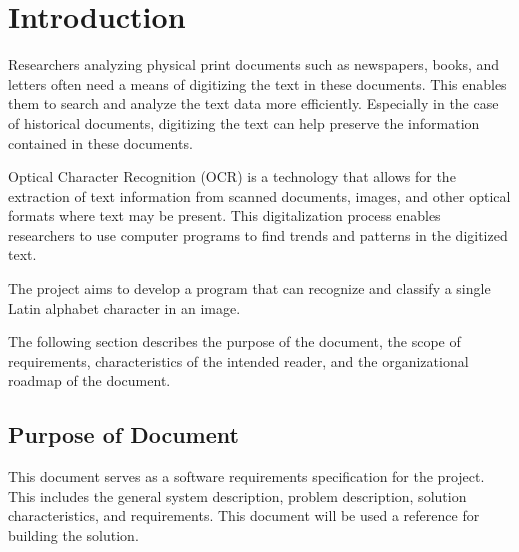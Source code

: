 \documentclass[12pt]{article}
\begin{document}


\section{Introduction}

Researchers analyzing physical print documents such as newspapers, books, and
letters often need a means of digitizing the text in these documents. This
enables them to search and analyze the text data more efficiently. Especially in
the case of historical documents, digitizing the text can help preserve the
information contained in these documents.

Optical Character Recognition (OCR) is a technology that allows for the
extraction of text information from scanned documents, images, and other optical
formats where text may be present. This digitalization process enables
researchers to use computer programs to find trends and patterns in the
digitized text.

The \progname{} project aims to develop a program that can recognize and
classify a single Latin alphabet character in an image.

The following section describes the purpose of the document, the scope of
requirements, characteristics of the intended reader, and the organizational
roadmap of the document.


\subsection{Purpose of Document}

This document serves as a software requirements specification for the \progname{}
project. This includes the general system description, problem description,
solution characteristics, and requirements. This document will be used a
reference for building the solution.
\end{document}
